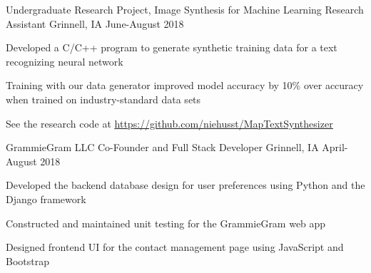 \documentclass[12pt, a4paper]{awesome-cv}
\begin{document}
\begin{cventries}
  \cventry
    {Undergraduate Research Project, Image Synthesis for Machine Learning}
    {Research Assistant}
    {Grinnell, IA}
    {June-August 2018}
    {
      \begin{cvitems}
        \item{Developed a C/C++ program to generate synthetic training data for a text recognizing neural network}
        \item{Training with our data generator improved model accuracy by 10\% over accuracy when trained on industry-standard data sets}
	    \item{See the research code at \underline{\href{https://github.com/niehusst/MapTextSynthesizer}{https://github.com/niehusst/MapTextSynthesizer}}}
      \end{cvitems}
    }




  \cventry
    {GrammieGram LLC}
    {Co-Founder and Full Stack Developer}
    {Grinnell, IA}
    {April-August 2018}
    {
      \begin{cvitems}
        \item {Developed the backend database design for user preferences using Python and the Django framework}
        \item {Constructed and maintained unit testing for the GrammieGram web app}
        \item {Designed frontend UI for the contact management page using JavaScript and Bootstrap}
      \end{cvitems}
    }

\end{cventries}
\end{document}
